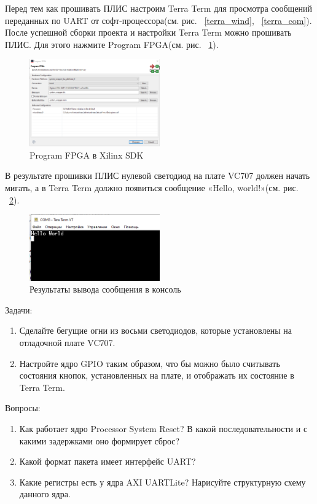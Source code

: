 \documentclass[a4paper,oneside ,14pt]{extreport}
\begin{document}
Перед тем как прошивать ПЛИС настроим Terra Term для просмотра сообщений переданных по UART от софт-процессора(см. рис. ~\ref{terra_wind}, ~\ref{terra_com}).
После успешной сборки проекта и настройки Terra Term можно прошивать ПЛИС. Для этого нажмите Program FPGA(см. рис. ~\ref{program_FPGA}).

\begin{figure}[!ht]
	\centering
	\includegraphics[width=0.5\textwidth]{image/program_FPGA.png}
	\caption{Program FPGA в Xilinx SDK}
	\label{program_FPGA}
\end{figure}

В результате прошивки ПЛИС нулевой светодиод на плате VC707 должен начать мигать, а в Terra Term должно появиться сообщение «Hello, world!»(см. рис. ~\ref{terra_result}).

\begin{figure}[!ht]
	\centering
	\includegraphics[width=0.5\textwidth]{image/terra_result.png}
	\caption{Результаты вывода сообщения в консоль}
	\label{terra_result}
\end{figure}

\newpage

Задачи:

\begin{enumerate}
	\item Сделайте бегущие огни из восьми светодиодов, которые установлены на отладочной плате VC707.
	\item Настройте ядро GPIO таким образом, что бы можно было считывать состояния кнопок, установленных на плате, и отображать их состояние в Terra Term.
\end{enumerate}

Вопросы:

\begin{enumerate}
	\item Как работает ядро Processor System Reset? В какой последовательности и с какими задержками оно формирует сброс?
	\item Какой формат пакета имеет интерфейс UART?
	\item Какие регистры есть у ядра AXI UARTLite? Нарисуйте структурную схему данного ядра.
\end{enumerate}
\end{document}
